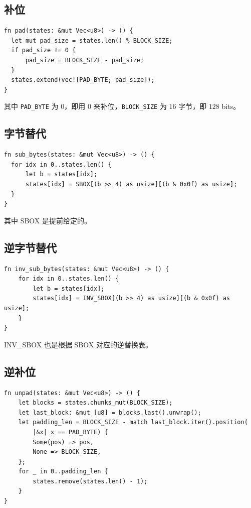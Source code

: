 \documentclass[degree=project,degree-type=project,cjk-font=noto]{thuthesis}
\begin{document}
\subsection{补位}

  \begin{verbatim}
fn pad(states: &mut Vec<u8>) -> () {
  let mut pad_size = states.len() % BLOCK_SIZE;
  if pad_size != 0 {
      pad_size = BLOCK_SIZE - pad_size;
  }
  states.extend(vec![PAD_BYTE; pad_size]);
}
  \end{verbatim}

其中 \texttt{PAD\_BYTE} 为 $0$，即用 $0$ 来补位，\texttt{BLOCK\_SIZE} 为 $16$ 字节，即 $128$ bits。

\subsection{字节替代}

  \begin{verbatim}
fn sub_bytes(states: &mut Vec<u8>) -> () {
  for idx in 0..states.len() {
      let b = states[idx];
      states[idx] = SBOX[(b >> 4) as usize][(b & 0x0f) as usize];
  }
}
  \end{verbatim}

其中 SBOX 是提前给定的。

\subsection{逆字节替代}

  \begin{verbatim}
fn inv_sub_bytes(states: &mut Vec<u8>) -> () {
    for idx in 0..states.len() {
        let b = states[idx];
        states[idx] = INV_SBOX[(b >> 4) as usize][(b & 0x0f) as usize];
    }
}
  \end{verbatim}

INV\_SBOX 也是根据 SBOX 对应的逆替换表。

\subsection{逆补位}

  \begin{verbatim}
fn unpad(states: &mut Vec<u8>) -> () {
    let blocks = states.chunks_mut(BLOCK_SIZE);
    let last_block: &mut [u8] = blocks.last().unwrap();
    let padding_len = BLOCK_SIZE - match last_block.iter().position(
        |&x| x == PAD_BYTE) {
        Some(pos) => pos,
        None => BLOCK_SIZE,
    };
    for _ in 0..padding_len {
        states.remove(states.len() - 1);
    }
}
  \end{verbatim}
\end{document}
